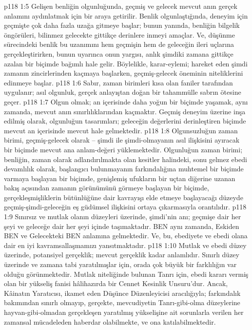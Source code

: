 \vs p118 1:5 Gelişen benliğin olgunluğunda, geçmiş ve gelecek mevcut anın gerçek anlamını aydınlatmak için bir araya getirilir. Benlik olgunlaştığında, deneyim için geçmişte çok daha fazla uzağa gitmeye başlar; bunun yanında, benliğin bilgelik öngörüleri, bilinmez gelecekte gittikçe derinlere inmeyi amaçlar. Ve, düşünme sürecindeki benlik bu uzanımını hem geçmişin hem de geleceğin ileri uçlarına gerçekleştirirken, bunun uyarınca onun yargısı, anlık şimdiki zamana gittikçe azalan bir biçimde bağımlı hale gelir. Böylelikle, karar\hyp{}eylemi; hareket eden şimdi zamanın zincirlerinden kaçmaya başlarken, geçmiş\hyp{}gelecek öneminin niteliklerini edinmeye başlar.
\vs p118 1:6 Sabır, zaman birimleri kısa olan faniler tarafından uygulanır; asıl olgunluk, gerçek anlayıştan doğan bir tahammülle sabrın ötesine geçer.
\vs p118 1:7 Olgun olmak; an içerisinde daha yoğun bir biçimde yaşamak, aynı zamanda, mevcut anın sınırlılıklarından kaçmaktır. Geçmiş deneyim üzerine inşa edilmiş olarak, olgunluğun tasarımları; geleceğin değerlerini derinleştiren biçimde mevcut an içerisinde mevcut hale gelmektedir.
\vs p118 1:8 Olgunsuzluğun zaman birimi, geçmiş\hyp{}gelecek olarak – şimdi ile şimdi\hyp{}olmayanın asıl ilişkisini ayıracak bir biçimde mevcut ana anlam\hyp{}değeri yüklemektedir. Olgunluğun zaman birimi; benliğin, zaman olarak adlandırılmakta olan kesitler halindeki, sonu gelmez ebedi devamlılık olarak, başlangıcı bulunmayanın farkındalığına muhtemel bir biçimde varmaya başlayan bir biçimde, genişlemiş ufukların bir uçtan diğerine uzanan bakış açısından zamanın görünümünü görmeye başlayan bir biçimde, gerçekleşmişliklerin bütünlüğüne dair kavrayışı elde etmeye başlayacağı düzeyde geçmiş\hyp{}şimdi\hyp{}geleceğin eş güdümsel ilişkisini ortaya çıkarmasıyla orantılıdır.
\vs p118 1:9 Sınırsız ve mutlak olanın düzeyleri üzerinde, şimdi’nin anı; geçmişe dair her şeyi ve geleceğe dair her şeyi içinde taşımaktadır. BEN aynı zamanda, Eskiden BEN ve Gelecekteki BEN anlamına gelmektedir. Ve, bu, ebediyete ve ebedi olana dair en iyi kavramsallaşmamızı yansıtmaktadır.
\vs p118 1:10 Mutlak ve ebedi düzey üzerinde, potansiyel gerçeklik; mevcut gerçeklik kadar anlamlıdır. Sınırlı düzey üzerinde ve zamana tabi yaratılmışlar için, orada çok büyük bir farklılığın var olduğu görünmektedir. Mutlak niteliğinde bulunan Tanrı için, ebedi kararı vermiş olan bir yükseliş fanisi hâlihazırda bir Cennet Kesinlik Unsuru’dur. Ancak, Kâinatın Yaratıcısı, ikamet eden Düşünce Düzenleyicisi aracılığıyla; farkındalık bakımından sınırlı olmayıp, gerçekte, mevcudiyetin Tanrı\hyp{}gibi\hyp{}olma düzeylerine hayvan\hyp{}gibi\hyp{}olmadan gerçekleşen yaratılmış yükselişine ait sorunlarla verilen her zamansal mücadeleden haberdar olabilmekte, ve ona katılabilmektedir.
